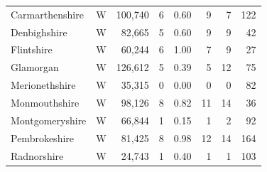 \documentclass[11pt,a4paper]{article}
\begin{document}
{\begin{longtable}{llrrrrrr}
Carmarthenshire & W & 100,740 & 6 & 0.60 & 9 & 7 & 122\\
Denbighshire & W & 82,665 & 5 & 0.60 & 9 & 9 & 42\\
Flintshire & W & 60,244 & 6 & 1.00 & 7 & 9 & 27\\
Glamorgan & W & 126,612 & 5 & 0.39 & 5 & 12 & 75\\
Merionethshire & W & 35,315 & 0 & 0.00 & 0 & 0 & 82\\
Monmouthshire & W & 98,126 & 8 & 0.82 & 11 & 14 & 36\\
Montgomeryshire & W & 66,844 & 1 & 0.15 & 1 & 2 & 92\\
Pembrokeshire & W & 81,425 & 8 & 0.98 & 12 & 14 & 164\\
Radnorshire & W & 24,743 & 1 & 0.40 & 1 & 1 & 103\\
\bottomrule\end{longtable}}
\end{document}

